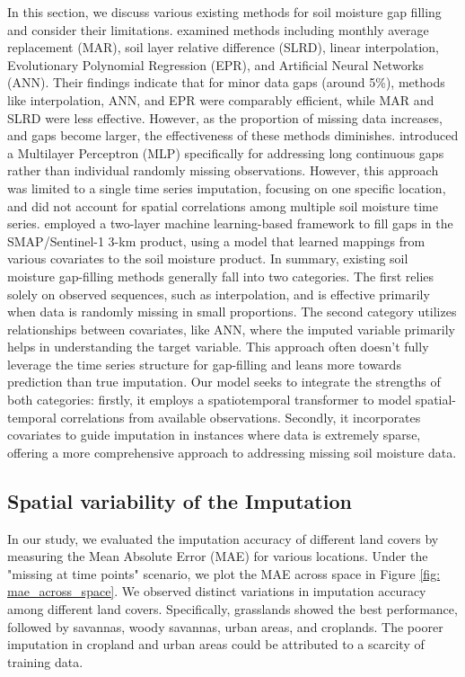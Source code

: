 \documentclass[11pt]{article}
\begin{document}
In this section, we discuss various existing methods for soil moisture gap filling and consider their limitations. \citet{kornelsen2014comparison} examined methods including monthly average replacement (MAR), soil layer relative difference (SLRD), linear interpolation, Evolutionary Polynomial Regression (EPR), and Artificial Neural Networks (ANN). Their findings indicate that for minor data gaps (around 5\%), methods like interpolation, ANN, and EPR were comparably efficient, while MAR and SLRD were less effective. However, as the proportion of missing data increases, and gaps become larger, the effectiveness of these methods diminishes. \cite{park2023long} introduced a Multilayer Perceptron (MLP) specifically for addressing long continuous gaps rather than individual randomly missing observations. However, this approach was limited to a single time series imputation, focusing on one specific location, and did not account for spatial correlations among multiple soil moisture time series. \citet{mao2019gap} employed a two-layer machine learning-based framework to fill gaps in the SMAP/Sentinel-1 3-km product, using a model that learned mappings from various covariates to the soil moisture product. In summary, existing soil moisture gap-filling methods generally fall into two categories. The first relies solely on observed sequences, such as interpolation, and is effective primarily when data is randomly missing in small proportions. The second category utilizes relationships between covariates, like ANN, where the imputed variable primarily helps in understanding the target variable. This approach often doesn't fully leverage the time series structure for gap-filling and leans more towards prediction than true imputation. Our model seeks to integrate the strengths of both categories: firstly, it employs a spatiotemporal transformer to model spatial-temporal correlations from available observations. Secondly, it incorporates covariates to guide imputation in instances where data is extremely sparse, offering a more comprehensive approach to addressing missing soil moisture data.


\subsection{Spatial variability of the Imputation}
In our study, we evaluated the imputation accuracy of different land covers by measuring the Mean Absolute Error (MAE) for various locations. Under the "missing at time points" scenario, we plot the MAE across space in Figure \ref{fig: mae_across_space}. We observed distinct variations in imputation accuracy among different land covers. Specifically, grasslands showed the best performance, followed by savannas, woody savannas, urban areas, and croplands. The poorer imputation in cropland and urban areas could be attributed to a scarcity of training data.
\end{document}
